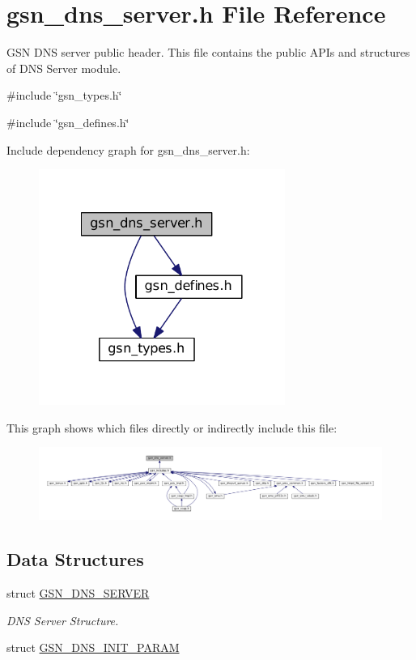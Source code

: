 \hypertarget{a00485}{
\section{gsn\_\-dns\_\-server.h File Reference}
\label{a00485}
}


GSN DNS server public header. This file contains the public APIs and structures of DNS Server module.  


{\ttfamily \#include \char`\"{}gsn\_\-types.h\char`\"{}}\par
{\ttfamily \#include \char`\"{}gsn\_\-defines.h\char`\"{}}\par
Include dependency graph for gsn\_\-dns\_\-server.h:
\nopagebreak
\begin{figure}[H]
\begin{center}
\leavevmode
\includegraphics[width=228pt]{a00714}
\end{center}
\end{figure}
This graph shows which files directly or indirectly include this file:
\nopagebreak
\begin{figure}[H]
\begin{center}
\leavevmode
\includegraphics[width=400pt]{a00715}
\end{center}
\end{figure}
\subsection*{Data Structures}
\begin{DoxyCompactItemize}
\item 
struct \hyperlink{a00055}{GSN\_\-DNS\_\-SERVER}
\begin{DoxyCompactList}\small\item\em DNS Server Structure. \end{DoxyCompactList}\item 
struct \hyperlink{a00054}{GSN\_\-DNS\_\-INIT\_\-PARAM}
\end{DoxyCompactItemize}

